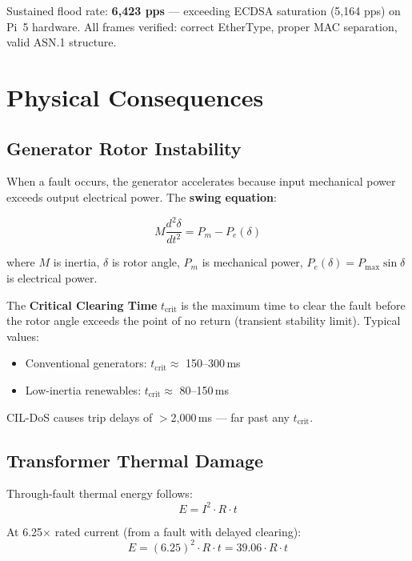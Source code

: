 \documentclass[11pt,a4paper,twocolumn]{article}
\begin{document}
Sustained flood rate: \textbf{6{,}423 pps} --- exceeding ECDSA saturation (5{,}164 pps) on Pi~5 hardware. All frames verified: correct EtherType, proper MAC separation, valid ASN.1 structure.

\section{Physical Consequences}
\label{sec:physical}

\subsection{Generator Rotor Instability}

When a fault occurs, the generator accelerates because input mechanical power exceeds output electrical power. The \textbf{swing equation}:

\begin{equation}
M \frac{d^2\delta}{dt^2} = P_m - P_e(\delta)
\end{equation}

where $M$ is inertia, $\delta$ is rotor angle, $P_m$ is mechanical power, $P_e(\delta) = P_{\max}\sin\delta$ is electrical power.

The \textbf{Critical Clearing Time} $t_{\text{crit}}$ is the maximum time to clear the fault before the rotor angle exceeds the point of no return (transient stability limit). Typical values:
\begin{itemize}[leftmargin=1.5em,itemsep=1pt]
\item Conventional generators: $t_{\text{crit}} \approx$ 150--300\,ms
\item Low-inertia renewables: $t_{\text{crit}} \approx$ 80--150\,ms
\end{itemize}

CIL-DoS causes trip delays of $>$2{,}000\,ms --- far past any $t_{\text{crit}}$.

\subsection{Transformer Thermal Damage}

Through-fault thermal energy follows:
\begin{equation}
E = I^2 \cdot R \cdot t
\end{equation}

At 6.25$\times$ rated current (from a fault with delayed clearing):
\begin{equation}
E = (6.25)^2 \cdot R \cdot t = 39.06 \cdot R \cdot t
\end{equation}
\end{document}
